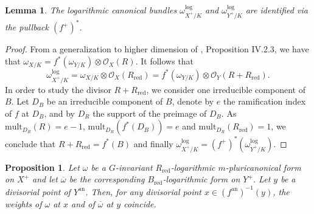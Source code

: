 \documentclass{amsart}%
\numberwithin{equation}{subsection}
\theoremstyle{plain2}
\newtheorem{lemma}[equation]{Lemma}
\newtheorem{prop}[equation]{Proposition}
\theoremstyle{definition2}
\theoremstyle{stepstyle}
\theoremstyle{point}
\theoremstyle{subpoint}
\newcommand{\redu}{\mathrm{red}}
\newcommand{\an}{\mathrm{an}}
\begin{document}
\begin{lemma} \label{lemma quotient map is log etale}
The logarithmic canonical bundles $\omega_{X^+/K}^{\log}$ and $\omega_{Y^+/K}^{\log}$ are identified via the pullback $(f^+)^*$. 
\end{lemma}
\begin{proof}
From a generalization to higher dimension of \cite{Hartshorne1977}, Proposition IV.2.3, we have that $\omega_{X/K}=f^*(\omega_{Y/K}) \otimes\mathcal{O}_{X}(R)$. It follows that 
$$\omega_{X^+/K}^{\log} = \omega_{X/K} \otimes\mathcal{O}_{X}(R_\redu) = f^*(\omega_{Y/K}) \otimes \mathcal{O}_{Y}(R + R_\redu).$$
In order to study the divisor $R + R_\redu$, we consider one irreducible component of $B$. Let $D_B$ be an irreducible component of $B$, denote by $e$ the ramification index of $f$ at $D_B$, and by $D_R$ the support of the preimage of $D_B$. As $\text{mult}_{D_R}(R)=e-1$, $\text{mult}_{D_R}(f^*(D_B))= e$ and $\text{mult}_{D_R}(R_\redu)=1$, we conclude that $R + R_\redu= f^*(B)$ and finally $\omega_{X^+/K}^{\log} = (f^+)^*(\omega_{Y^+/K}^{\log})$.
\end{proof}
\begin{prop} \label{prop:G inv form and corresponding weights}
Let $\omega$ be a $G$-invariant $R_\redu$-logarithmic $m$-pluricanonical form on $X^+$ and let $\overline{\omega}$ be the corresponding $B_\redu$-logarithmic form on $Y^+$. Let $y$ be a divisorial point of $Y^\an$. Then, for any divisorial point $x \in (f^\an)^{-1}(y)$, the weights of $\omega$ at $x$ and of $\overline{\omega}$ at $y$ coincide.
\end{prop}
\end{document}
